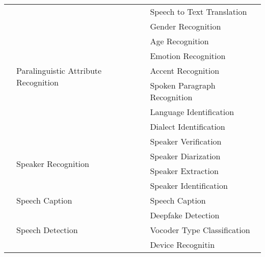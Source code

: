 \begin{longtable}{p{1.5cm}p{6cm}p{7cm}}
                             &                      & Speech to Text Translation            \\  %
                             \cline{2-3} %
                            & \multirow{7}{*}{Paralinguistic Attribute Recognition} &  Gender Recognition      \\
                            &                                       &  Age Recognition                         \\
                            &                                       &  Emotion Recognition                     \\
                            &                                       &  Accent Recognition                      \\
                            &                                       &  Spoken Paragraph Recognition            \\
                            &                                       &  Language Identification                 \\
                            &                                       &  Dialect Identification                  \\
                            \cline{2-3} %
                            & \multirow{4}{*}{Speaker Recognition}   & Speaker Verification                   \\
                            &                        & Speaker Diarization           \\
                            &                        & Speaker Extraction            \\
                            &                        & Speaker Identification        \\
                            \cline{2-3} %
                            & \multirow{1}{*}{Speech Caption}    & Speech Caption        \\
                            \cline{2-3} %
                            & \multirow{3}{*}{Speech Detection}  & Deepfake Detection    \\
                                            &    & Vocoder Type Classification           \\
                                            &    & Device Recognitin           \\
                                             \cline{2-3}

\end{longtable}
